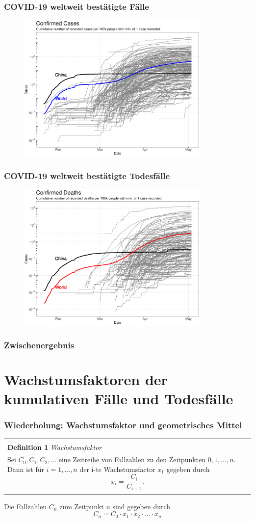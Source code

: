 \documentclass{beamer}
\newenvironment{boxeded}
    {\begin{center}
    \begin{tabular}{|p{0.9\textwidth}|}
    \hline\\
    }
    { 
    \\\\\hline
    \end{tabular} 
    \end{center}
    }
\begin{document}
 \begin{frame}
 	\frametitle{COVID-19 weltweit bestätigte Fälle}
	\begin{figure}
		\centering
		\includegraphics[width = 270pt]{Cases_cumulative_confirmed.pdf}
	\end{figure}
 \end{frame}

 \begin{frame}
 	\frametitle{COVID-19 weltweit bestätigte Todesfälle}
	\begin{figure}
		\centering
		\includegraphics[width = 270pt]{Cases_cumulative_deaths.pdf}
	\end{figure}
 \end{frame}

 \begin{frame}
 	\frametitle{Zwischenergebnis}
 \end{frame}

\section{Wachstumsfaktoren der kumulativen Fälle und Todesfälle}
\begin{frame}
	\frametitle{Wiederholung: Wachstumsfaktor und geometrisches Mittel}
	\begin{boxeded}
		\textbf{Definition 1} \textit{Wachstumsfaktor}\\
		Sei $C_0, C_1, C_2, ...$ eine Zeitreihe von Fallzahlen zu den Zeitpunkten $0, 1, ..., n$. Dann ist für $i = 1, ..., n$ der i-te Wachstumsfactor $x_1$ gegeben durch $$ x_i = \frac{C_i}{C_{i-1}}.$$
	\end{boxeded}

	Die Fallzahlen $C_n$ zum Zeitpunkt $n$ sind gegeben durch $$C_n = C_0 \cdot x_1 \cdot x_2 \cdot ... \cdot x_n$$
\end{frame}
\end{document}
